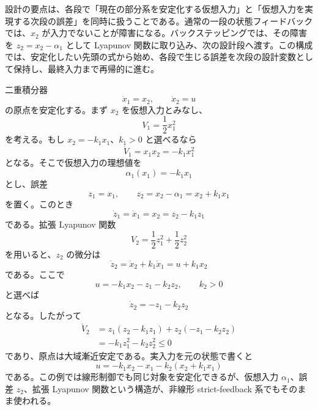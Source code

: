 設計の要点は、各段で「現在の部分系を安定化する仮想入力」と「仮想入力を実現する次段の誤差」を同時に扱うことである。通常の一段の状態フィードバックでは、$x_2$ が入力でないことが障害になる。バックステッピングでは、その障害を $z_2=x_2-\alpha_1$ として Lyapunov 関数に取り込み、次の設計段へ渡す。この構成では、安定化したい先頭の式から始め、各段で生じる誤差を次段の設計変数として保持し、最終入力まで再帰的に進む。

\begin{example}[二重積分器に対するバックステッピング]
二重積分器
\begin{equation}
  \dot{x}_1=x_2,\qquad \dot{x}_2=u
\end{equation}
の原点を安定化する。まず $x_2$ を仮想入力とみなし、
\begin{equation}
  V_1=\frac{1}{2}x_1^2
\end{equation}
を考える。もし $x_2=-k_1x_1$、$k_1>0$ と選べるなら
\begin{equation}
  \dot{V}_1=x_1x_2=-k_1x_1^2
\end{equation}
となる。そこで仮想入力の理想値を
\begin{equation}
  \alpha_1(x_1)=-k_1x_1
\end{equation}
とし、誤差
\begin{equation}
  z_1=x_1,\qquad z_2=x_2-\alpha_1=x_2+k_1x_1
\end{equation}
を置く。このとき
\begin{equation}
  \dot{z}_1=\dot{x}_1=x_2=z_2-k_1z_1
\end{equation}
である。拡張 Lyapunov 関数
\begin{equation}
  V_2=\frac{1}{2}z_1^2+\frac{1}{2}z_2^2
\end{equation}
を用いると、$z_2$ の微分は
\begin{equation}
  \dot{z}_2=\dot{x}_2+k_1\dot{x}_1=u+k_1x_2
\end{equation}
である。ここで
\begin{equation}
  u=-k_1x_2-z_1-k_2z_2,\qquad k_2>0
\end{equation}
と選べば
\begin{equation}
  \dot{z}_2=-z_1-k_2z_2
\end{equation}
となる。したがって
\begin{align}
  \dot{V}_2
  &=z_1(z_2-k_1z_1)+z_2(-z_1-k_2z_2)\\
  &=-k_1z_1^2-k_2z_2^2
  \le0
\end{align}
であり、原点は大域漸近安定である。実入力を元の状態で書くと
\begin{equation}
  u=-k_1x_2-x_1-k_2(x_2+k_1x_1)
\end{equation}
である。この例では線形制御でも同じ対象を安定化できるが、仮想入力 $\alpha_1$、誤差 $z_2$、拡張 Lyapunov 関数という構造が、非線形 strict-feedback 系でもそのまま使われる。
\end{example}

